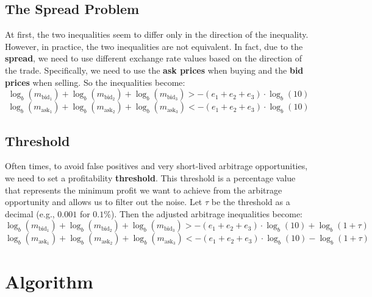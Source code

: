 \documentclass[11pt]{article}
\begin{document}
\subsection{The Spread Problem}
At first, the two inequalities seem to differ only in the direction of the inequality. However, in practice, the two inequalities are not equivalent. In fact, due to the \textbf{spread}, we need to use different exchange rate values based on the direction of the trade. Specifically, we need to use the \textbf{ask prices} when buying and the \textbf{bid prices} when selling. So the inequalities become:
\setcounter{equation}{0}
\begin{equation}
    \log_b(m_{\text{bid}_1}) + \log_b(m_{\text{bid}_2}) + \log_b(m_{\text{bid}_3}) > -(e_1 + e_2 + e_3) \cdot \log_b(10)
\end{equation}
\begin{equation}
    \log_b(m_{\text{ask}_1}) + \log_b(m_{\text{ask}_2}) + \log_b(m_{\text{ask}_3}) < -(e_1 + e_2 + e_3) \cdot \log_b(10)
\end{equation}

\subsection{Threshold}
Often times, to avoid false positives and very short-lived arbitrage opportunities, we need to set a profitability \textbf{threshold}. This threshold is a percentage value that represents the minimum profit we want to achieve from the arbitrage opportunity and allows us to filter out the noise.
Let $\tau$ be the threshold as a decimal (e.g., $0.001$ for $0.1\%$). Then the adjusted arbitrage inequalities become:
\setcounter{equation}{0}
\begin{equation}
    \log_b(m_{\text{bid}_1}) + \log_b(m_{\text{bid}_2}) + \log_b(m_{\text{bid}_3}) > -(e_1 + e_2 + e_3) \cdot \log_b(10) + \log_b(1 + \tau)
\end{equation}
\begin{equation}
    \log_b(m_{\text{ask}_1}) + \log_b(m_{\text{ask}_2}) + \log_b(m_{\text{ask}_3}) < -(e_1 + e_2 + e_3) \cdot \log_b(10) - \log_b(1 + \tau)
\end{equation}

\section{Algorithm}
\end{document}
